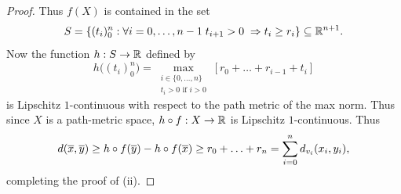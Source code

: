 \begin{proof}
Thus $f(X)$ is contained in the set
\[
S = \{(t_i)_0^n : \forall i = 0,\ldots,n - 1 \; t_{i + 1} > 0 \; \Rightarrow t_i \geq r_i\} \subset \R^{n + 1}.
\]
Now the function $h:S\to\R$ defined by
\[
h\big((t_i)_0^n\big) = \max_{\substack{i \in\{0,\ldots,n\} \\ t_i > 0 \text{ if }i > 0}} [r_0 + \ldots + r_{i - 1} + t_i]
\]
is Lipschitz $1$-continuous with respect to the path metric of the max norm. Thus since $X$ is a path-metric space, $h\circ f:X\to\R$ is Lipschitz $1$-continuous. Thus
\[
d(\overline x,\overline y) \geq h\circ f(\overline y) - h\circ f(\overline x) \geq r_0 + \ldots + r_n = \sum_{i = 0}^n d_{v_i}(x_i,y_i),
\]
completing the proof of (ii).


%
%

\end{proof}
